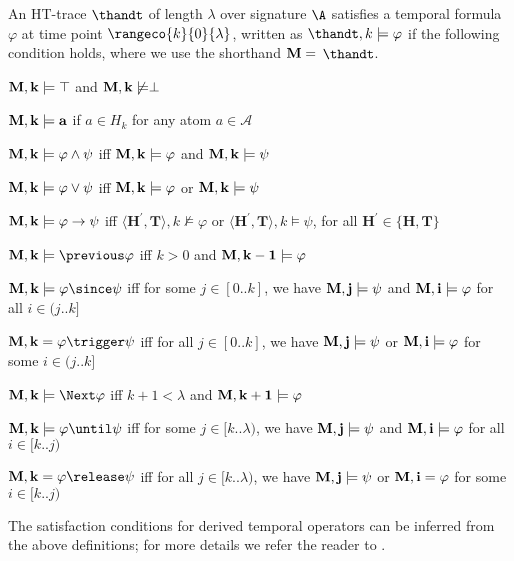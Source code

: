 \begin{definition}
  An HT-trace $\thandt$ of length $\lambda$ over signature $\A$
  satisfies a temporal formula $\varphi$ at time point
  $\rangeco{k}{0}{\lambda}$, written as $\thandt,k \models \varphi$ if
  the following condition holds, where we use the shorthand
  $\bf{M} =$ $\thandt$.
\begin{description}
  \item $\bf{M},k \models \top$ and $\bf{M}, k \not \models \perp$
  \item $\bf{M},k \models a$ if $a \in H_{k}$ for any atom $a \in \mathcal{A}$
  \item $\bf{M},k \models \varphi \wedge \psi$ iff $\bf{M}, k \models \varphi$ and $\bf{M}, k \models \psi$
  \item $\bf{M},k \models \varphi \vee \psi$ iff $\bf{M}, k \models \varphi$ or $\bf{M}, k \models \psi$
  \item $\bf{M},k \models \varphi \rightarrow \psi$ iff 
    $\langle \bm{H}^{\prime},\bm{T} \rangle, k \not \models \varphi$ 
    or $\langle \bm{H}^{\prime},\bm{T} \rangle, k \models \psi$, 
    for all $\bm{H}^{\prime} \in\{\bm{H}, \bm{T}\}$
  \item $\bf{M},k \models \previous \varphi$ iff $k>0$ and $\bf{M},k-1 \models \varphi$
  \item $\bf{M},k \models \varphi \since \psi$ iff for some $j \in[0 . . k]$, we have $\bf{M}, j \models \psi$ and $\bf{M},i \models \varphi$ for all $i \in(j . . k]$
  \item $\bf{M},k=\varphi \trigger \psi$ iff for all $j \in[0 . . k]$, we have $\bf{M}, j \models \psi$ or $\bf{M}, i \models \varphi$ for some $i \in(j . . k]$
  \item $\bf{M},k \models \Next \varphi$ iff $k+1<\lambda$ and $\bf{M}, k+1 \models \varphi$
  \item $\bf{M}, k \models \varphi \until \psi$ iff for some $j \in[k . . \lambda)$, we have $\bf{M}, j \models \psi$ and $\bf{M}, i \models \varphi$ for all $i \in[k . . j)$
  \item $\bf{M}, k=\varphi \release \psi$ iff for all $j \in[k
    . . \lambda)$, we have $\bf{M}, j \models \psi$ or $\bf{M},
    i=\varphi$ for some $i \in[k . . j)$
\end{description}
\end{definition}

The satisfaction conditions for derived temporal operators can be
inferred from the above definitions; for more details we refer the
reader to \cite{agcadipescscvi20a}.

